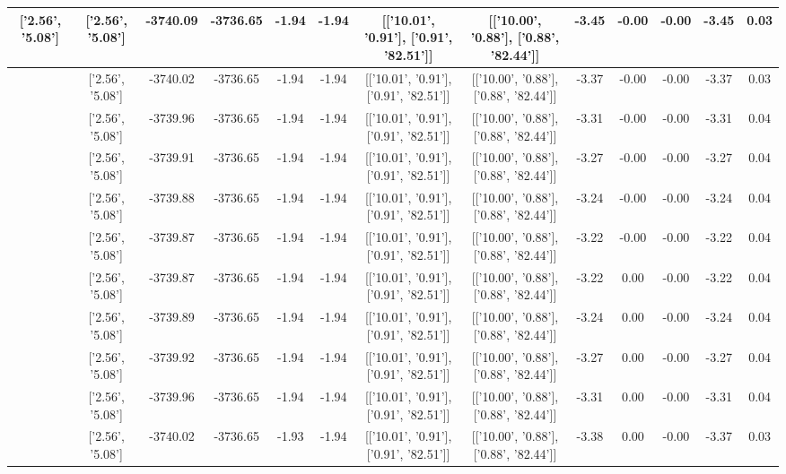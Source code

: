 \begin{table}[htbp]
\begin{adjustbox}{angle=90}
\begin{tabular}{|c|c|c|c|c|c|c|c|c|c|c|c|c|}
 ['2.56', '5.08'] & ['2.56', '5.08'] & -3740.09 & -3736.65 & -1.94 & -1.94 & [['10.01', '0.91'], ['0.91', '82.51']] & [['10.00', '0.88'], ['0.88', '82.44']] & -3.45 & -0.00 & -0.00 & -3.45 & 0.03\\ \hline
 ['2.56', '5.08'] & ['2.56', '5.08'] & -3740.02 & -3736.65 & -1.94 & -1.94 & [['10.01', '0.91'], ['0.91', '82.51']] & [['10.00', '0.88'], ['0.88', '82.44']] & -3.37 & -0.00 & -0.00 & -3.37 & 0.03\\ \hline
 ['2.56', '5.08'] & ['2.56', '5.08'] & -3739.96 & -3736.65 & -1.94 & -1.94 & [['10.01', '0.91'], ['0.91', '82.51']] & [['10.00', '0.88'], ['0.88', '82.44']] & -3.31 & -0.00 & -0.00 & -3.31 & 0.04\\ \hline
 ['2.56', '5.08'] & ['2.56', '5.08'] & -3739.91 & -3736.65 & -1.94 & -1.94 & [['10.01', '0.91'], ['0.91', '82.51']] & [['10.00', '0.88'], ['0.88', '82.44']] & -3.27 & -0.00 & -0.00 & -3.27 & 0.04\\ \hline
 ['2.56', '5.08'] & ['2.56', '5.08'] & -3739.88 & -3736.65 & -1.94 & -1.94 & [['10.01', '0.91'], ['0.91', '82.51']] & [['10.00', '0.88'], ['0.88', '82.44']] & -3.24 & -0.00 & -0.00 & -3.24 & 0.04\\ \hline
 ['2.56', '5.08'] & ['2.56', '5.08'] & -3739.87 & -3736.65 & -1.94 & -1.94 & [['10.01', '0.91'], ['0.91', '82.51']] & [['10.00', '0.88'], ['0.88', '82.44']] & -3.22 & -0.00 & -0.00 & -3.22 & 0.04\\ \hline
 ['2.56', '5.09'] & ['2.56', '5.08'] & -3739.87 & -3736.65 & -1.94 & -1.94 & [['10.01', '0.91'], ['0.91', '82.51']] & [['10.00', '0.88'], ['0.88', '82.44']] & -3.22 & 0.00 & -0.00 & -3.22 & 0.04\\ \hline
 ['2.56', '5.09'] & ['2.56', '5.08'] & -3739.89 & -3736.65 & -1.94 & -1.94 & [['10.01', '0.91'], ['0.91', '82.51']] & [['10.00', '0.88'], ['0.88', '82.44']] & -3.24 & 0.00 & -0.00 & -3.24 & 0.04\\ \hline
 ['2.57', '5.09'] & ['2.56', '5.08'] & -3739.92 & -3736.65 & -1.94 & -1.94 & [['10.01', '0.91'], ['0.91', '82.51']] & [['10.00', '0.88'], ['0.88', '82.44']] & -3.27 & 0.00 & -0.00 & -3.27 & 0.04\\ \hline
 ['2.57', '5.09'] & ['2.56', '5.08'] & -3739.96 & -3736.65 & -1.94 & -1.94 & [['10.01', '0.91'], ['0.91', '82.51']] & [['10.00', '0.88'], ['0.88', '82.44']] & -3.31 & 0.00 & -0.00 & -3.31 & 0.04\\ \hline
 ['2.57', '5.09'] & ['2.56', '5.08'] & -3740.02 & -3736.65 & -1.93 & -1.94 & [['10.01', '0.91'], ['0.91', '82.51']] & [['10.00', '0.88'], ['0.88', '82.44']] & -3.38 & 0.00 & -0.00 & -3.37 & 0.03\\ \hline

\end{tabular}
\end{adjustbox}
\end{table}
